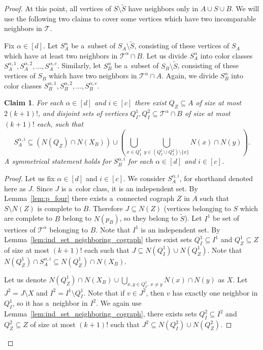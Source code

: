 \documentclass[11pt,a4paper]{article}
\newtheorem{claim}[theorem]{Claim}
\theoremstyle{definition}
\def\T{\mathcal{T}}
\begin{document}
\begin{proof}
At this point, all vertices of $S \setminus \widetilde{S}$
have neighbors only in $A\cup S \cup B$. We will use the following two claims to cover
some vertices which have two incomparable neighbors in $\T$. 

Fix $\alpha\in[d]$. Let $S_A^\alpha$ be a~subset of $S_A\setminus \widetilde{S}$, consisting of these vertices of $S_A$ which have at least two neighbors in $\T^\alpha\cap B$. Let us divide $S_A^\alpha$ into color classes $S_A^{\alpha,1},S_A^{\alpha, 2},\dots, S_A^{\alpha,c}$. Similarly, let $S_B^\alpha$ be a~subset of $S_B\setminus \widetilde{S}$, consisting of these vertices of $S_B$ which have two neighbors in $\T^\alpha\cap A$. Again, we divide $S_B^\alpha$ into  color classes $S_B^{\alpha,1}, S_B^{\alpha,2}, \dots, S_B^{\alpha,c}$.

\begin{claim}\label{cl:two_on_same_level}
For each $\alpha\in[d]$ and $i\in[c]$ there exist
$Q_Z \subseteq A$ of size at most $2(k+1)!$, and disjoint sets of vertices $Q_I^1,Q_I^2 \subseteq \T^\alpha \cap B$ of size at most $(k+1)!$ each, such that 
$$S_A^{\alpha, i} \subseteq \left(N(Q_Z)\cap N(X_B) \right)\cup \left(\bigcup_{x\in Q_I^1}\bigcup_{y\in (Q_I^1\cup Q_I^2)\setminus \{x\}} N(x)\cap N(y)\right).$$
A symmetrical statement holds for $S_B^{\alpha,i}$ for each $\alpha\in[d]$ and $i\in[c]$.
\end{claim}
\begin{proof}
    Let us fix $\alpha\in[d]$ and $i\in[c]$. We consider $S_A^{\alpha, i}$, for shorthand denoted here as $J$. Since $J$ is a~color class, it is an independent set. By Lemma~\ref{lem:p_four} there exists a~connected cograph $Z$ in $A$ such that $S\setminus N(Z)$ is complete to $B$. Therefore $J\subseteq N(Z)$ (vertices belonging to $S$ which are complete to $B$ belong to $N(p_B)$, so they belong to $\widetilde{S}$). Let $I^1$ be set of vertices of $\T^\alpha$ belonging to $B$. Note that $I^1$ is an independent set. By Lemma~\ref{lem:ind_set_neighboring_cograph} there exist sets $Q_I^1\subseteq I^1$ and $Q_Z^1\subseteq Z$ of size at most $(k+1)!$ each such that $J\subseteq N(Q_I^1)\cup N(Q_Z^1)$. Note that $N(Q_Z^1)\cap S_A^{\alpha, i} \subseteq N(Q_Z^1)\cap N(X_B)$.
    
    Let us denote  $N(Q_Z^1)\cap N(X_B) \cup \bigcup_{x,y\in Q_I^1,\ x\neq y} N(x)\cap N(y)$ as $X$. Let $J^2 = J \setminus X$ and $I^2 = I^1 \setminus Q_I^1$. Note that if $v\in J^2$, then $v$ has exactly one neighbor in $Q_I^1$, so it has a~neighbor in $I^2$. We again use Lemma~\ref{lem:ind_set_neighboring_cograph}, there exists sets  $Q_I^2\subseteq I^2$ and $Q_Z^2\subseteq Z$ of size at most $(k+1)!$ such that $J^2\subseteq N(Q_I^2)\cup N(Q_Z^2)$.
    

\end{proof}
\end{proof}
\end{document}
